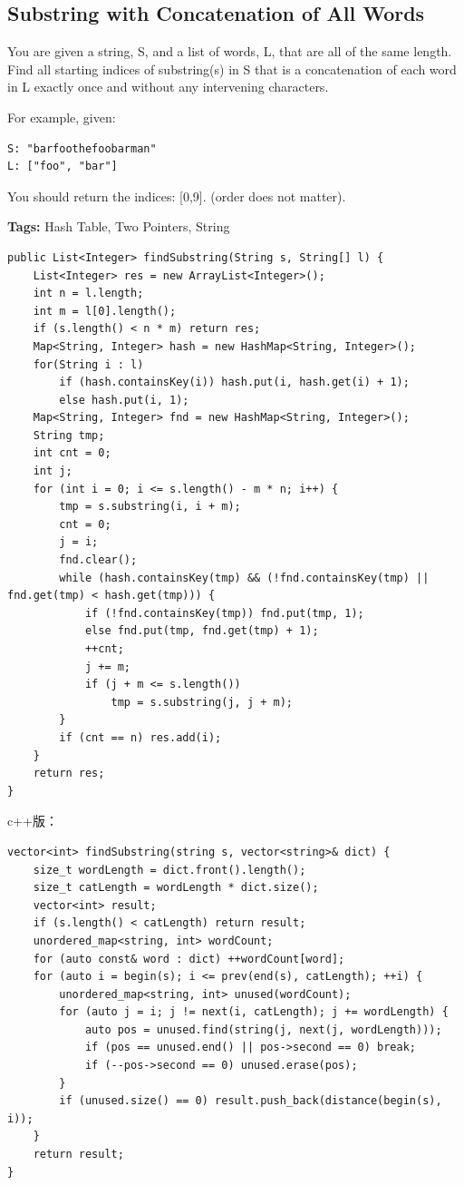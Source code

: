 \documentclass[12pt]{book}
\begin{document}
\subsection{Substring with Concatenation of All Words}
\label{sec-20-1-10}
You are given a string, S, and a list of words, L, that are all of the same length. Find all starting indices of substring(s) in S that is a concatenation of each word in L exactly once and without any intervening characters.

For example, given:
\lstset{language=java,label= ,caption= ,numbers=none}
\begin{lstlisting}
S: "barfoothefoobarman"
L: ["foo", "bar"]
\end{lstlisting}

You should return the indices: [0,9].
(order does not matter).

\textbf{Tags:} Hash Table, Two Pointers, String

\lstset{language=java,label= ,caption= ,numbers=none}
\begin{lstlisting}
public List<Integer> findSubstring(String s, String[] l) {
    List<Integer> res = new ArrayList<Integer>();
    int n = l.length;
    int m = l[0].length();
    if (s.length() < n * m) return res;
    Map<String, Integer> hash = new HashMap<String, Integer>();
    for(String i : l)
        if (hash.containsKey(i)) hash.put(i, hash.get(i) + 1);                    
        else hash.put(i, 1); 
    Map<String, Integer> fnd = new HashMap<String, Integer>();
    String tmp;
    int cnt = 0;
    int j;
    for (int i = 0; i <= s.length() - m * n; i++) {
        tmp = s.substring(i, i + m);
        cnt = 0;
        j = i;
        fnd.clear();
        while (hash.containsKey(tmp) && (!fnd.containsKey(tmp) || fnd.get(tmp) < hash.get(tmp))) {
            if (!fnd.containsKey(tmp)) fnd.put(tmp, 1);
            else fnd.put(tmp, fnd.get(tmp) + 1);
            ++cnt;
            j += m;
            if (j + m <= s.length())
                tmp = s.substring(j, j + m);
        }
        if (cnt == n) res.add(i);
    }
    return res;
}
\end{lstlisting}

c++版：
\lstset{language=java,label= ,caption= ,numbers=none}
\begin{lstlisting}
vector<int> findSubstring(string s, vector<string>& dict) {
    size_t wordLength = dict.front().length();
    size_t catLength = wordLength * dict.size();
    vector<int> result;
    if (s.length() < catLength) return result;
    unordered_map<string, int> wordCount;
    for (auto const& word : dict) ++wordCount[word];
    for (auto i = begin(s); i <= prev(end(s), catLength); ++i) {
        unordered_map<string, int> unused(wordCount);
        for (auto j = i; j != next(i, catLength); j += wordLength) {
            auto pos = unused.find(string(j, next(j, wordLength)));
            if (pos == unused.end() || pos->second == 0) break;
            if (--pos->second == 0) unused.erase(pos);
        }
        if (unused.size() == 0) result.push_back(distance(begin(s), i));
    }
    return result;
}
\end{lstlisting}
\end{document}
